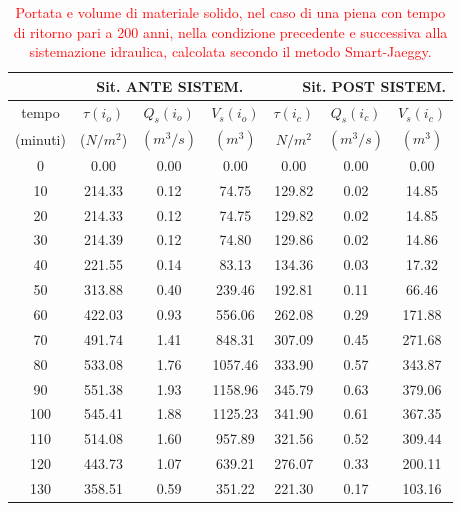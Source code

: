 \begin{table}[H] \centering
    \caption{\textcolor{red}{Portata e volume di materiale solido, nel caso di una piena con tempo di ritorno pari a 200 anni, nella condizione precedente e successiva alla sistemazione idraulica, calcolata secondo il metodo Smart-Jaeggy.}}
    \begin{tabular}{ccccccc}
\toprule
& \multicolumn{3}{c}{Sit. ANTE SISTEM.} & \multicolumn{3}{r}{Sit. POST SISTEM.} \\
\midrule
    tempo & $\tau(i_o)$ & $Q_s(i_o)$ & $V_s(i_o)$ & $\tau(i_c)$ & $Q_s(i_c)$ & $V_s(i_c)$ \\
    (minuti) & ($N/m^2$) & $(m^3/s)$ & $(m^3)$ & $N/m^2$ & $(m^3/s)$ & $(m^3)$ \\
\midrule
    0 & 0.00 & 0.00   & 0.00 & 0.00     & 0.00   & 0.00   \\
    10 & 214.33 & 0.12   & 74.75 & 129.82      & 0.02   & 14.85  \\
    20 & 214.33 & 0.12   & 74.75   & 129.82 & 0.02   & 14.85  \\
    30       & 214.39 & 0.12   & 74.80   & 129.86 & 0.02   & 14.86  \\
    40       & 221.55  & 0.14   & 83.13   & 134.36 & 0.03   & 17.32  \\
    50       & 313.88                       & 0.40   & 239.46  & 192.81                       & 0.11   & 66.46  \\
    60       & 422.03                       & 0.93   & 556.06  & 262.08                       & 0.29   & 171.88 \\
    70       & 491.74                       & 1.41   & 848.31  & 307.09                       & 0.45   & 271.68 \\
    80       & 533.08                       & 1.76   & 1057.46 & 333.90                       & 0.57   & 343.87 \\
    90       & 551.38                       & 1.93   & 1158.96 & 345.79                       & 0.63   & 379.06 \\
    100      & 545.41                       & 1.88   & 1125.23 & 341.90                       & 0.61   & 367.35 \\
    110      & 514.08                       & 1.60   & 957.89  & 321.56                       & 0.52   & 309.44 \\
    120      & 443.73                       & 1.07   & 639.21  & 276.07                       & 0.33   & 200.11 \\
    130      & 358.51                       & 0.59   & 351.22  & 221.30                       & 0.17   & 103.16 \\

\end{tabular}
\end{table}

